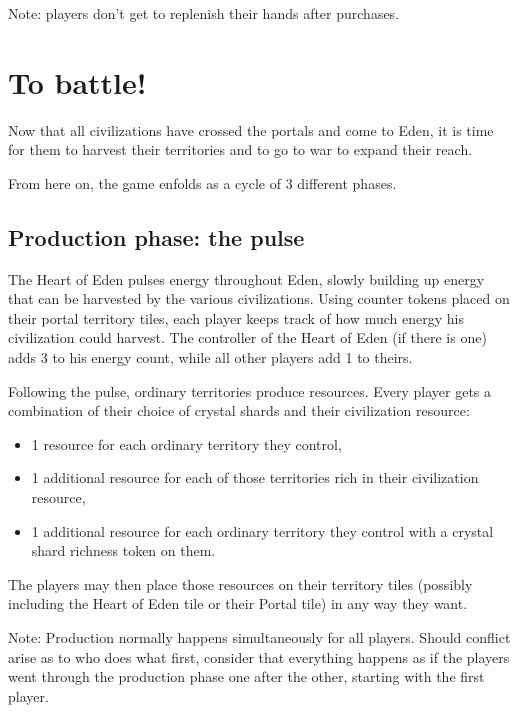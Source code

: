 \documentclass[a4paper]{article}
\begin{document}
        Note: players don't get to replenish their hands after purchases.


\section{To battle!}

    Now that all civilizations have crossed the portals and come to Eden,
    it is time for them to harvest their territories and to go to war to expand
    their reach.
    
    From here on, the game enfolds as a cycle of 3 different phases.
    
    \subsection{Production phase: the pulse}
        \label{prod}
        The Heart of Eden pulses energy throughout Eden,
        slowly building up energy that can be harvested by the various civilizations.
        Using counter tokens placed on their portal territory tiles,
        each player keeps track of how much energy his civilization could harvest.      
        The controller of the Heart of Eden (if there is one) adds 3 to his energy count,
        while all other players add 1 to theirs.
    
        Following the pulse, ordinary territories produce resources.
        Every player gets a combination of their choice of crystal shards
        and their civilization resource:
        \vspace{-1.3em}
        \begin{itemize}
            \item 1 resource for each ordinary territory they control,
            \item 1 additional resource for each of those territories
                rich in their civilization resource,
            \item 1 additional resource for each ordinary territory they control
                with a crystal shard richness token on them.
        \end{itemize}
        
        The players may then place those resources on their territory tiles
        (possibly including the Heart of Eden tile or their Portal tile)
        in any way they want.
        
        Note: Production normally happens simultaneously for all players.
        Should conflict arise as to who does what first,
        consider that everything happens as if the players went through
        the production phase one after the other, starting with the first player.
\end{document}
